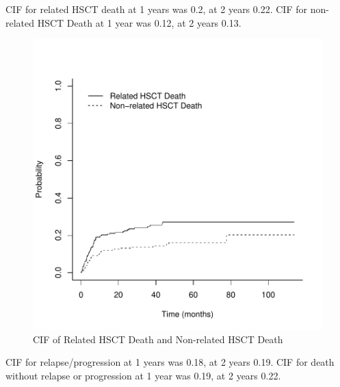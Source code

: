 \documentclass[a4paper,11pt] {article}
\begin{document}
\pagebreak
CIF for related HSCT death at 1 years was 0.2, at 2 years  0.22.
CIF for non-related HSCT Death at 1 year was 0.12, at 2 years  0.13.
\begin{figure}[h]
\begin{center}
\includegraphics{Rapport-fig5}
\end{center}
\caption{CIF of Related HSCT Death and Non-related HSCT Death}
\label{fig5}
\end{figure}

\pagebreak
CIF for relapse/progression at 1 years was 0.18, at 2 years  0.19.
CIF for death without relapse or progression at 1 year was 0.19, at 2 years  0.22. 
\end{document}
